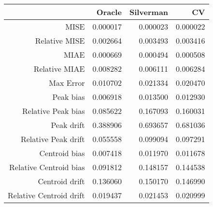 \begin{tabular}{rrrr}
  \hline
 & Oracle & Silverman & CV \\ 
  \hline
MISE & 0.000017 & 0.000023 & 0.000022 \\ 
  Relative MISE & 0.002664 & 0.003493 & 0.003416 \\ 
  MIAE & 0.000669 & 0.000494 & 0.000508 \\ 
  Relative MIAE & 0.008282 & 0.006111 & 0.006284 \\ 
  Max Error & 0.010702 & 0.021334 & 0.020470 \\ 
  Peak bias & 0.006918 & 0.013500 & 0.012930 \\ 
  Relative Peak bias & 0.085622 & 0.167093 & 0.160031 \\ 
  Peak drift & 0.388906 & 0.693657 & 0.681036 \\ 
  Relative Peak drift & 0.055558 & 0.099094 & 0.097291 \\ 
  Centroid bias & 0.007418 & 0.011970 & 0.011678 \\ 
  Relative Centroid bias & 0.091812 & 0.148157 & 0.144538 \\ 
  Centroid drift & 0.136060 & 0.150170 & 0.146990 \\ 
  Relative Centroid drift & 0.019437 & 0.021453 & 0.020999 \\ 
   \hline
\end{tabular}
